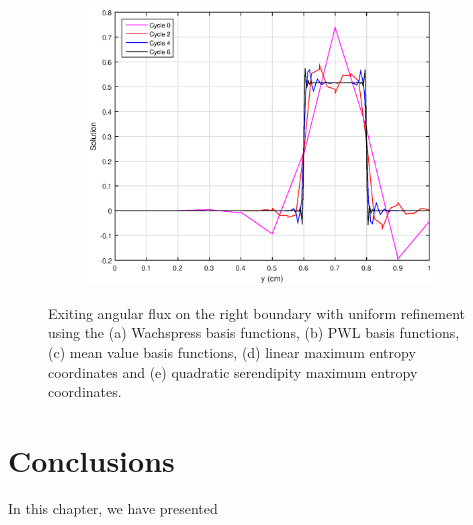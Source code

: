 \begin{figure}
\begin{subfigure}[b]{0.45\textwidth}
		\centering
		\label{subfig::SL_uniform_ef_me2}
		\includegraphics[width=\textwidth]{figures/sec_BF/SL_ME_k2_uniform.eps}
		\caption{}
	\end{subfigure}
\caption{Exiting angular flux on the right boundary with uniform refinement using the (a) Wachspress basis functions, (b) PWL basis functions, (c) mean value basis functions, (d) linear maximum entropy coordinates and (e) quadratic serendipity maximum entropy coordinates.}
\label{fig::BF_Results_SL_uniform_exit_flux}
\end{figure}

\section{Conclusions}
\label{sec::BF_Conclusions}

In this chapter, we have presented 







